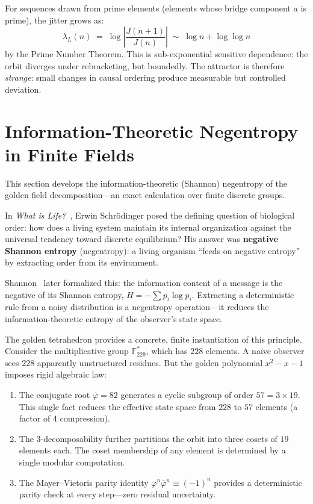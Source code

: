 \documentclass[12pt,oneside]{article}
\theoremstyle{principia}
\theoremstyle{definition}
\theoremstyle{remark}
\begin{document}
For sequences drawn from prime elements (elements whose
bridge component $a$ is prime), the jitter grows as:
\[
\lambda_L(n) \;=\; \log\!\left|\frac{J(n+1)}{J(n)}\right|
\;\sim\; \log n + \log\log n
\]
by the Prime Number Theorem. This is sub-exponential sensitive
dependence: the orbit diverges under rebracketing, but
boundedly. The attractor is therefore \emph{strange}: small
changes in causal ordering produce measurable but controlled
deviation.

\section{Information-Theoretic Negentropy in Finite Fields}
\label{sec:negentropy}

This section develops the information-theoretic (Shannon) negentropy of the golden field decomposition---an exact calculation over finite discrete groups.

In \emph{What is Life?}~\cite{schrodinger44}, Erwin Schr\"odinger posed
the defining question of biological order: how does a living system
maintain its internal organization against the universal tendency
toward discrete equilibrium? His answer was \textbf{negative
Shannon entropy} (negentropy): a living organism ``feeds on negative entropy''
by extracting order from its environment.

Shannon~\cite{shannon48} later formalized this: the information content
of a message is the negative of its Shannon entropy,
$H = -\sum p_i \log p_i$. Extracting a deterministic rule from a
noisy distribution is a negentropy operation---it reduces the
information-theoretic entropy of the observer's state space.

The golden tetrahedron provides a concrete, finite instantiation
of this principle. Consider the multiplicative group
$\mathbb{F}_{229}^*$, which has $228$ elements. A na\"ive observer
sees $228$ apparently unstructured residues. But the golden
polynomial $x^2 - x - 1$ imposes rigid algebraic law:

\begin{enumerate}
  \item The conjugate root $\bar\varphi = 82$ generates a cyclic
    subgroup of order $57 = 3 \times 19$. This single fact reduces
    the effective state space from $228$ to $57$ elements (a factor
    of $4$ compression).
  \item The $3$-decomposability further partitions the orbit into
    three cosets of $19$ elements each. The coset membership of
    any element is determined by a single modular computation.
  \item The Mayer--Vietoris parity identity
    $\varphi^n \bar\varphi^n \equiv (-1)^n$ provides a deterministic
    parity check at every step---zero residual uncertainty.
\end{enumerate}
\end{document}
